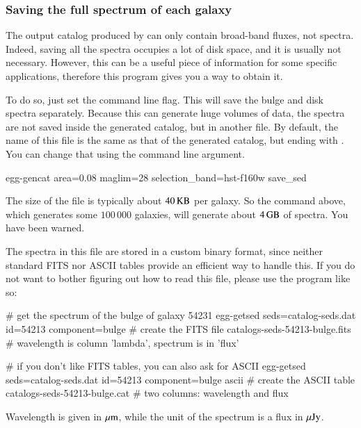 \documentclass[12pt,a4paper]{article}
\newcommand{\um}{\mu{\rm m}}
\newcommand{\uJy}{\mu{\rm Jy}}
\begin{document}
\subsubsection{Saving the full spectrum of each galaxy}

The output catalog produced by  can only contain broad-band fluxes, not spectra. Indeed, saving all the spectra occupies a lot of disk space, and it is usually not necessary. However, this can be a useful piece of information for some specific applications, therefore this program gives you a way to obtain it.

To do so, just set the  command line flag. This will save the bulge and disk spectra separately. Because this can generate huge volumes of data, the spectra are not saved inside the generated catalog, but in another file. By default, the name of this file is the same as that of the generated catalog, but ending with . You can change that using the  command line argument.
\begin{bashcode}
egg-gencat area=0.08 maglim=28 selection_band=hst-f160w save_sed
\end{bashcode}
The size of the file is typically about $40\,{\rm KB}$ per galaxy. So the command above, which generates some $100\,000$ galaxies, will generate about $4\,{\rm GB}$ of spectra. You have been warned.

The spectra in this file are stored in a custom binary format, since neither standard FITS nor ASCII tables provide an efficient way to handle this. If you do not want to bother figuring out how to read this file, please use the  program like so:
\begin{bashcode}
# get the spectrum of the bulge of galaxy 54231
egg-getsed seds=catalog-seds.dat id=54213 component=bulge
# create the FITS file catalogs-seds-54213-bulge.fits
# wavelength is column 'lambda', spectrum is in 'flux'

# if you don't like FITS tables, you can also ask for ASCII
egg-getsed seds=catalog-seds.dat id=54213 component=bulge ascii
# create the ASCII table catalogs-seds-54213-bulge.cat
# two columns: wavelength and flux
\end{bashcode}
Wavelength is given in $\um$, while the unit of the spectrum is a flux in $\uJy$.
\end{document}
